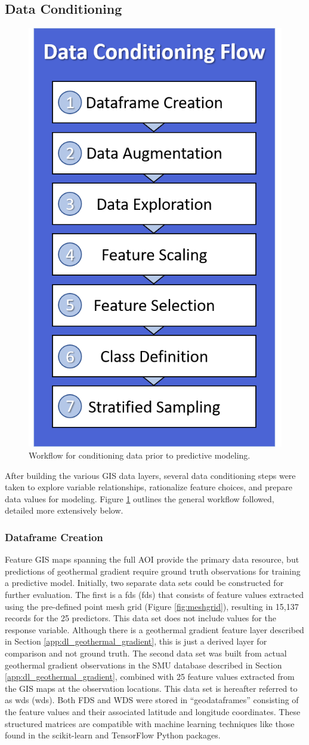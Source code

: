 \subsection{Data Conditioning}\label{ch3:conditioning}

\begin{figure}
\centering
\includegraphics[width=0.35\linewidth]{templates/images/Flow-DataConditioning.png}
\singlespacing
\caption[Data conditioning workflow]{Workflow for conditioning data prior to predictive modeling.}
\label{fig:DC_Flow}
\end{figure}
After building the various GIS data layers, several data conditioning steps were taken to explore variable relationships, rationalize feature choices, and prepare data values for modeling. Figure \ref{fig:DC_Flow} outlines the general workflow followed, detailed more extensively below.

\subsubsection{Dataframe Creation}
Feature GIS maps spanning the full AOI provide the primary data resource, but predictions of geothermal gradient require ground truth observations for training a predictive model. Initially, two separate data sets could be constructed for further evaluation. The first is a \acrlong{fds} (\acrshort{fds}) that consists of feature values extracted using the pre-defined point mesh grid (Figure \ref{fig:meshgrid}), resulting in 15,137 records for the 25 predictors. This data set does not include values for the response variable. Although there is a geothermal gradient feature layer described in Section \ref{app:dl_geothermal_gradient}, this is just a derived layer for comparison and not ground truth. The second data set was built from actual geothermal gradient observations in the SMU database described in Section \ref{app:dl_geothermal_gradient}, combined with 25 feature values extracted from the GIS maps at the observation locations. This data set is hereafter referred to as \acrlong{wds} (\acrshort{wds}). Both FDS and WDS were stored in ``geodataframes'' consisting of the feature values and their associated latitude and longitude coordinates. These structured matrices are compatible with machine learning techniques like those found in the scikit-learn \citep{pedregosa_scikit-learn_2011} and TensorFlow \citep{abadi_tensorflow_2016} Python packages. 

